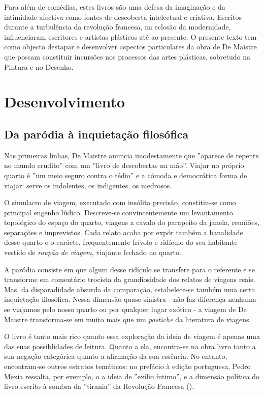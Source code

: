 \documentclass[12pt]{article}
\begin{document}
Para além de comédias, estes livros são uma defesa da imaginação e da
intimidade afectiva como fontes de descoberta intelectual e
criativa. Escritos durante a turbulência da revolução francesa, na
eclosão da modernidade, influenciaram escritores e artistas plásticos
até ao presente. O presente texto tem como objecto destapar e
desenvolver aspectos particulares da obra de De Maistre que possam
constituir incursões nos processos das artes plásticas, sobretudo na
Pintura e no Desenho.

\section{Desenvolvimento}

\subsection{Da paródia à inquietação filosófica}

Nas primeiras linhas, De Maistre anuncia imodestamente que ''aparece
de repente no mundo erudito'' com um ''livro de descobertas na
mão''. Viajar no próprio quarto é ''um meio seguro contra o tédio'' e
a cómoda e democrática forma de viajar: serve os indolentes, os
indigentes, os medrosos.

O simulacro de viagem, executado com insólita precisão, constitiu-se
como principal engenho lúdico. Descreve-se convincentemente um
levantamento topológico do espaço do quarto, viagens a cavalo do
parapeito da janela, reuniões, separações e imprevistos. Cada relato
acaba por expõr também a banalidade desse quarto e o carácte,
frequentemente frívolo e ridículo do seu habitante vestido de
\emph{roupão de viagem}, viajante fechado no quarto.

A paródia consiste em que algum desse ridículo se transfere para o
referente e se transforme em comentário trocista da grandiosidade dos
relatos de viagens reais. Mas, da disparadidade absurda da comparação,
estabelece-se também uma certa inquietação filosófica. Nessa dimensão
quase sinistra - não faz diferença nenhuma se viajamos pelo nosso
quarto ou por qualquer lugar exótico - a viagem de De Maistre
transforma-se em muito mais que um \emph{pastiche} da literatura de
viagens.

O livro é tanto mais rico quanto essa exploração da ideia de viagem é
apenas uma das suas possiblidades de leitura. Quanto a ela,
encontra-se na obra livro tanto a sua negação categórica
\cite{queiros} quanto a afirmação da sua essência. No entanto,
encontram-se outros estratos temáticos: no prefácio à edição
portuguesa, Pedro Mexia ressalta, por exemplo, o a ideia de ''exílio
íntimo'', e a dimensão política do livro escrito à sombra da
''tirania'' da Revolução Francesa (\cite[p.10]{demaistre}).
\end{document}
